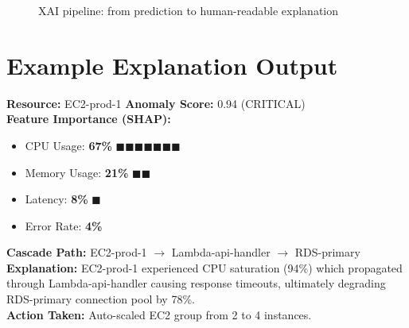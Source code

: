 \documentclass[12pt,a4paper]{report}
\begin{document}
\begin{figure}[H]
\centering
{}
\caption{XAI pipeline: from prediction to human-readable explanation}
\label{fig:xaipipeline}
\end{figure}

\section{Example Explanation Output}

\begin{mdframed}[linecolor=purpleviolet, linewidth=1pt,
  innerleftmargin=12pt, innerrightmargin=12pt]
\textbf{Resource:} EC2-prod-1 \hfill
\textbf{Anomaly Score:} 0.94 (CRITICAL)\\[4pt]
\textbf{Feature Importance (SHAP):}
\begin{itemize}[nosep]
  \item CPU Usage: \textbf{67\%} $\blacksquare\blacksquare\blacksquare
        \blacksquare\blacksquare\blacksquare\blacksquare$
  \item Memory Usage: \textbf{21\%} $\blacksquare\blacksquare$
  \item Latency: \textbf{8\%} $\blacksquare$
  \item Error Rate: \textbf{4\%}
\end{itemize}
\textbf{Cascade Path:} EC2-prod-1 $\to$ Lambda-api-handler $\to$
RDS-primary\\[4pt]
\textbf{Explanation:} EC2-prod-1 experienced CPU saturation (94\%)
which propagated through Lambda-api-handler causing response timeouts,
ultimately degrading RDS-primary connection pool by 78\%.\\[4pt]
\textbf{Action Taken:} Auto-scaled EC2 group from 2 to 4 instances.
\end{mdframed}
\end{document}
